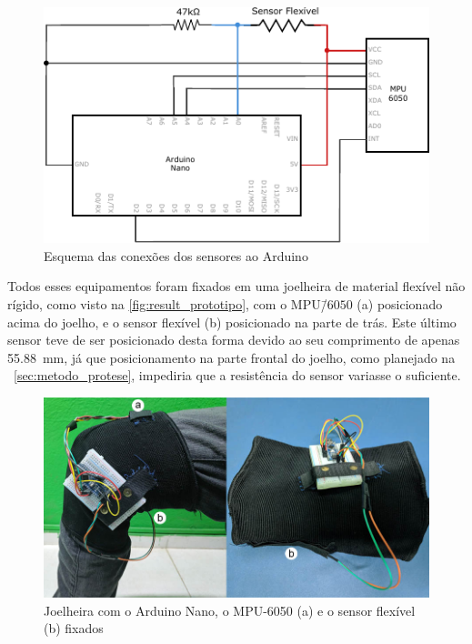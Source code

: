 \begin{figure}[ht]
	\caption{\label{fig:result_schem}Esquema das conexões dos sensores ao Arduino}
	\begin{center}
	    \includegraphics[width=.8\textwidth]{resources/result_schem}
	\end{center}
\end{figure}

Todos esses equipamentos foram fixados em uma joelheira de material flexível não rígido, como visto na \autoref{fig:result_prototipo}, com o MPU\=/\(6050\) (a) posicionado acima do joelho, e o sensor flexível (b) posicionado na parte de trás. Este último sensor teve de ser posicionado desta forma devido ao seu comprimento de apenas \SI{55.88}{\milli\meter}, já que posicionamento na parte frontal do joelho, como planejado na ~\autoref{sec:metodo_protese}, impediria que a resistência do sensor variasse o suficiente.

\begin{figure}[ht]
	\caption{\label{fig:result_prototipo}Joelheira com o Arduino Nano, o MPU-6050 (a) e o sensor flexível (b) fixados}
	\begin{center}
	    \includegraphics[width=.8\textwidth]{resources/result_prototipo}
	\end{center}
\end{figure}

